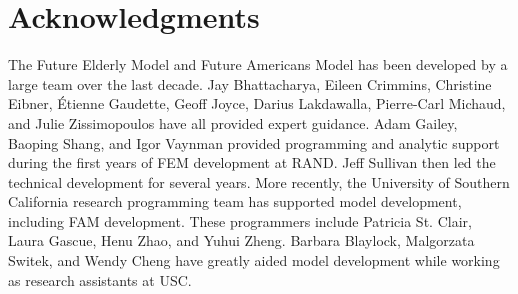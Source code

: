 \section{Acknowledgments}

The Future Elderly Model and Future Americans Model has been developed by a large team over the last decade.  Jay Bhattacharya, Eileen Crimmins, Christine Eibner, \'Etienne Gaudette, Geoff Joyce, Darius Lakdawalla,
Pierre-Carl Michaud, and Julie Zissimopoulos have all provided expert guidance.  Adam Gailey, Baoping Shang, and Igor Vaynman provided programming and analytic 
support during the first years of FEM development at RAND.  Jeff Sullivan then led the technical development for several years.  More recently, the University of 
Southern California research programming team has supported model development, including FAM development.  These programmers include Patricia St. Clair, Laura Gascue, Henu Zhao, and Yuhui Zheng. 
Barbara Blaylock, Malgorzata Switek, and Wendy Cheng have greatly aided model development while working as research assistants at USC.

